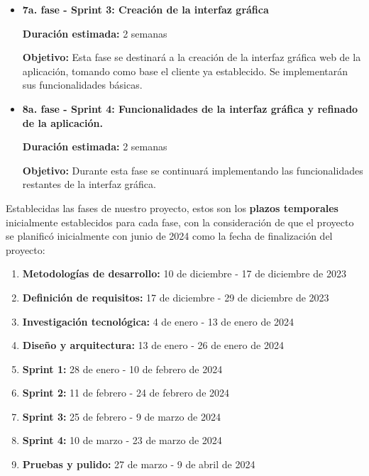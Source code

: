 \begin{itemize}
	\textbf{Duración estimada:} 2 semanas
	
	\textbf{Objetivo:} Durante esta fase continúa la implementación del cliente, añadiendo las funcionalidades restantes y asegurando una correcta interpretación de mensajes y almacenamiento correcto de los datos. 
	
	
	\item \textbf{7a. fase - Sprint 3: Creación de la interfaz gráfica}
	
	\textbf{Duración estimada:} 2 semanas
	
	\textbf{Objetivo:} Esta fase se destinará a la creación de la interfaz gráfica web de la aplicación, tomando como base el cliente ya establecido. Se implementarán sus funcionalidades básicas. 
	
	\item \textbf{8a. fase - Sprint 4: Funcionalidades de la interfaz gráfica y refinado de la aplicación.}
	
	\textbf{Duración estimada:} 2 semanas
	
	\textbf{Objetivo:} Durante esta fase se continuará implementando las funcionalidades restantes de la interfaz gráfica. 
\end{itemize}


Establecidas las fases de nuestro proyecto, estos son los \textbf{plazos temporales} inicialmente establecidos para cada fase, con la consideración de que el proyecto se planificó inicialmente con junio de 2024 como la fecha de finalización del proyecto:

\begin{enumerate}
	\item \textbf{Metodologías de desarrollo:} 10 de diciembre - 17 de diciembre de 2023
	\item \textbf{Definición de requisitos:} 17 de diciembre - 29 de diciembre de 2023
	\item \textbf{Investigación tecnológica:} 4 de enero - 13 de enero de 2024
	\item \textbf{Diseño y arquitectura:} 13 de enero - 26 de enero de 2024
	\item \textbf{Sprint 1:} 28 de enero - 10 de febrero de 2024
	\item \textbf{Sprint 2:} 11 de febrero - 24 de febrero de 2024
	\item \textbf{Sprint 3:} 25 de febrero - 9 de marzo de 2024
	\item \textbf{Sprint 4:} 10 de marzo - 23 de marzo de 2024
	\item \textbf{Pruebas y pulido:} 27 de marzo - 9 de abril de 2024
\end{enumerate}


